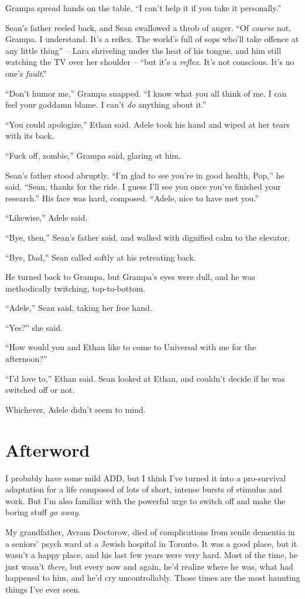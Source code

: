 Grampa spread hands on the table. “I can't help it if you take it 
personally.”

Sean's father reeled back, and Sean swallowed a throb of anger. “Of 
\emph{course} not, Grampa. I understand. It's a reflex. The world's 
full of sops who'll take offence at any little thing” -- Lara 
shriveling under the heat of his tongue, and him still watching the TV 
over her shoulder -- “but it's a \emph{reflex}. It's not conscious. 
It's no one's \emph{fault}.”

“Don't humor me,” Grampa snapped. “I know what you all think of 
me. I can feel your goddamn blame. I can't \emph{do} anything about 
it.”

“You could apologize,” Ethan said. Adele took his hand and wiped at 
her tears with its back.

“Fuck off, zombie,” Grampa said, glaring at him.

Sean's father stood abruptly. “I'm glad to see you're in good health, 
Pop,” he said. “Sean, thanks for the ride. I guess I'll see you 
once you've finished your research.” His face was hard, composed. 
“Adele, nice to have met you.”

“Likewise,” Adele said.

“Bye, then,” Sean's father said, and walked with dignified calm to 
the elevator.

“Bye, Dad,” Sean called softly at his retreating back.

He turned back to Grampa, but Grampa's eyes were dull, and he was 
methodically twitching, top-to-bottom.

“Adele,” Sean said, taking her free hand.

“Yes?” she said.

“How would you and Ethan like to come to Universal with me for the 
afternoon?”

“I'd love to,” Ethan said. Sean looked at Ethan, and couldn't 
decide if he was switched off or not.

Whichever, Adele didn't seem to mind.

\section{Afterword}

I probably have some mild ADD, but I think I've turned it into a 
pro-survival adaptation for a life composed of lots of short, intense 
bursts of stimulus and work. But I'm also familiar with the powerful 
urge to switch off and make the boring stuff \emph{go away}.

My grandfather, Avram Doctorow, died of complications from senile 
dementia in a seniors' psych ward at a Jewish hospital in Toronto. It 
was a good place, but it wasn't a happy place, and his last few years 
were very hard. Most of the time, he just wasn't \emph{there}, but 
every now and again, he'd realize where he was, what had happened to 
him, and he'd cry uncontrollably. Those times are the most haunting 
things I've ever seen.



